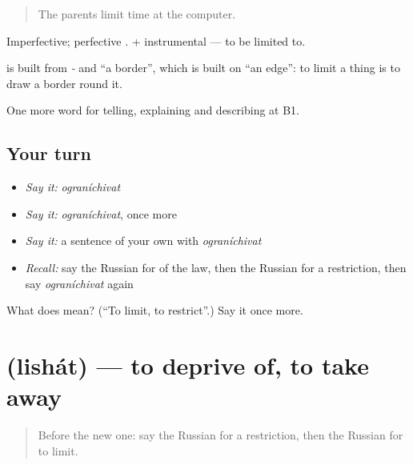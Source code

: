 \begin{quote}
The parents limit time at the computer.
\end{quote}

Imperfective; perfective \emph{}. \emph{} + instrumental — to be limited to.

\begin{cousinweb}
\textbf{} is built from \emph{-} and \emph{} \textquotedblleft{}a border\textquotedblright{}, which is built on \emph{} \textquotedblleft{}an edge\textquotedblright{}: to limit a thing is to draw a border round it.
\end{cousinweb}

\begin{grammarlens}[title={What you've built}]
One more word for telling, explaining and describing at B1.
\end{grammarlens}

\subsection*{Your turn}
\begin{itemize}
\raggedright
  \item \emph{Say it:} \emph{ograníchivat}
  \item \emph{Say it:} \emph{ograníchivat}, once more
  \item \emph{Say it:} a sentence of your own with \emph{ograníchivat}
  \item \emph{Recall:} say the Russian for of the law, then the Russian for a restriction, then say \emph{ograníchivat} again
\end{itemize}

\begin{tcolorbox}[breakable,colback=teal!4,colframe=teal!35!black,title={Before you move on}]
What does  mean? (\textquotedblleft{}To limit, to restrict\textquotedblright{}.) Say it once more.
\end{tcolorbox}
\section[\texorpdfstring{\ru{лишать} (lishát)}{лишать (lishát)}]{ (lishát) — to deprive of, to take away}

\label{lesson:RU-C392-lishat}



\begin{quote}
Before the new one: say the Russian for a restriction, then the Russian for to limit.
\end{quote}

